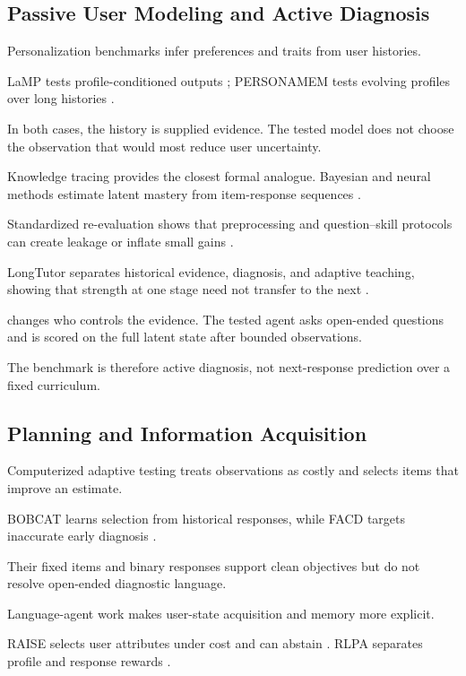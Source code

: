 \subsection{Passive User Modeling and Active Diagnosis}

Personalization benchmarks infer preferences and traits from user histories.

LaMP tests profile-conditioned outputs \citep{salemi2024lamp}; PERSONAMEM tests evolving profiles over
long histories \citep{jiang2025personamem}.

In both cases, the history is supplied evidence. The tested model does not choose the observation that
would most reduce user uncertainty.

Knowledge tracing provides the closest formal analogue. Bayesian and neural methods estimate latent
mastery from item-response sequences \citep{corbett1994knowledgetracing,piech2015dkt,ghosh2020akt}.

Standardized re-evaluation shows that preprocessing and question--skill protocols can create leakage or
inflate small gains \citep{liu2022pykt}.

LongTutor separates historical evidence, diagnosis, and adaptive teaching, showing that strength at one
stage need not transfer to the next \citep{li2026longtutor}.

\knowact changes who controls the evidence. The tested agent asks open-ended questions and is scored on
the full latent state after bounded observations.

The benchmark is therefore active diagnosis, not next-response prediction over a fixed curriculum.

\subsection{Planning and Information Acquisition}

Computerized adaptive testing treats observations as costly and selects items that improve an estimate.

BOBCAT learns selection from historical responses, while FACD targets inaccurate early diagnosis
\citep{ghosh2021bobcat,liu2025facd}.

Their fixed items and binary responses support clean objectives but do not resolve open-ended diagnostic
language.

Language-agent work makes user-state acquisition and memory more explicit.

RAISE selects user attributes under cost and can abstain \citep{wu2025raise}. RLPA separates profile and
response rewards \citep{zhao2025rlpa}.

